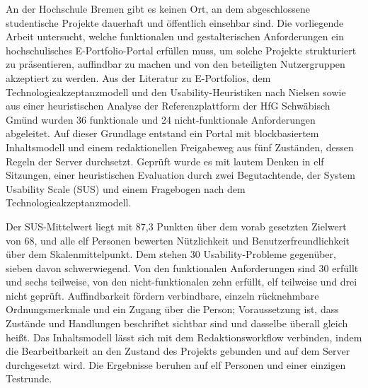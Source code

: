 
An der Hochschule Bremen gibt es keinen Ort, an dem abgeschlossene studentische Projekte dauerhaft und öffentlich einsehbar sind. Die vorliegende Arbeit untersucht, welche funktionalen und gestalterischen Anforderungen ein hochschulisches E-Portfolio-Portal erfüllen muss, um solche Projekte strukturiert zu präsentieren, auffindbar zu machen und von den beteiligten Nutzergruppen akzeptiert zu werden. Aus der Literatur zu E-Portfolios, dem Technologieakzeptanzmodell und den Usability-Heuristiken nach Nielsen sowie aus einer heuristischen Analyse der Referenzplattform der HfG Schwäbisch Gmünd wurden 36 funktionale und 24 nicht-funktionale Anforderungen abgeleitet. Auf dieser Grundlage entstand ein Portal mit blockbasiertem Inhaltsmodell und einem redaktionellen Freigabeweg aus fünf Zuständen, dessen Regeln der Server durchsetzt. Geprüft wurde es mit lautem Denken in elf Sitzungen, einer heuristischen Evaluation durch zwei Begutachtende, der System Usability Scale (SUS) und einem Fragebogen nach dem Technologieakzeptanzmodell.

Der SUS-Mittelwert liegt mit 87,3 Punkten über dem vorab gesetzten Zielwert von 68, und alle elf Personen bewerten Nützlichkeit und Benutzerfreundlichkeit über dem Skalenmittelpunkt. Dem stehen 30 Usability-Probleme gegenüber, sieben davon schwerwiegend. Von den funktionalen Anforderungen sind 30 erfüllt und sechs teilweise, von den nicht-funktionalen zehn erfüllt, elf teilweise und drei nicht geprüft. Auffindbarkeit fördern verbindbare, einzeln rücknehmbare Ordnungsmerkmale und ein Zugang über die Person; Voraussetzung ist, dass Zustände und Handlungen beschriftet sichtbar sind und dasselbe überall gleich heißt. Das Inhaltsmodell lässt sich mit dem Redaktionsworkflow verbinden, indem die Bearbeitbarkeit an den Zustand des Projekts gebunden und auf dem Server durchgesetzt wird. Die Ergebnisse beruhen auf elf Personen und einer einzigen Testrunde.
